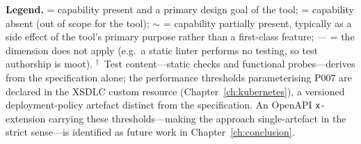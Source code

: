 \begin{table}[htbp]
\centering
\caption{Comparison of API quality approaches across six dimensions.}
\label{tab:tool-comparison}
\small
{}

\smallskip
\noindent\footnotesize\textbf{Legend.} \cmark{} = capability present and a primary design goal of the tool; \xmark{} = capability absent (out of scope for the tool); $\sim$ = capability partially present, typically as a side effect of the tool's primary purpose rather than a first-class feature; --- = the dimension does not apply (e.g.\ a static linter performs no testing, so test authorship is moot). $^\dagger$~Test content---static checks and functional probes---derives from the specification alone; the performance thresholds parameterising P007 are declared in the XSDLC custom resource (Chapter~\ref{ch:kubernetes}), a versioned deployment-policy artefact distinct from the specification. An OpenAPI \texttt{x-}extension carrying these thresholds---making the approach single-artefact in the strict sense---is identified as future work in Chapter~\ref{ch:conclusion}.
\end{table}

